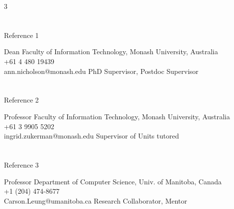 \documentclass{my_cv}
\begin{document}
\begin{multicols}{3}

\section{\faUniversity}{Reference 1}
    
%
    {Dean}%
    {Faculty of Information Technology, Monash University, Australia\\ 
    \faPhone \hspace{5pt} +61 4 480 19439 \hspace{20pt}\\
    \faEnvelope \hspace{5pt} ann.nicholson@monash.edu}
    {PhD Supervisor, Postdoc Supervisor}



\columnbreak

\section{\faInstitution}{Reference 2}

%
    {Professor}%
    {Faculty of Information Technology, Monash University, Australia\\ 
    \faPhone \hspace{5pt} +61 3 9905 5202 \hspace{20pt}\\
    \faEnvelope \hspace{5pt} ingrid.zukerman@monash.edu}
    {Supervisor of Units tutored}


\columnbreak

\section{\faInstitution}{Reference 3}

%
    {Professor}%
    {Department of Computer Science, Univ. of Manitoba, Canada\\
    \faPhone \hspace{5pt}  +1 (204) 474-8677 \hspace{20pt}\\
    \faEnvelope \hspace{5pt} Carson.Leung@umanitoba.ca}
    {Research Collaborator, Mentor}

\end{multicols}
\end{document}
